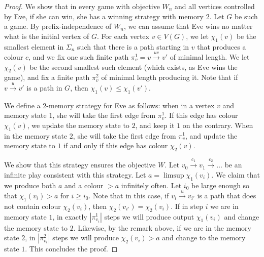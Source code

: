 \documentclass[a4paper,UKenglish,cleveref, thm-restate]{lipics-v2021}
\newcommand{\re}[1]{\xrightarrow{#1}}
\renewcommand{\SS}{\Sigma}
\begin{document}
\begin{proof}
    We show that in every game with objective $W_n$ and all vertices controlled by Eve, if she can win, she has a winning strategy with memory $2$.
    Let $G$ be such a game.
    By prefix-independence of $W_n$, we can assume that Eve wins no matter what is the initial vertex of $G$.
    For each vertex $v\in V(G)$, we let $\chi_1(v)$ be the smallest element in $\SS_n$ such that there is a path starting in $v$ that produces a colour $c$, and we fix one such finite path $\pi_v^1 = v \re{ uc} v'$ of minimal length.
    We let $\chi_2(v)$ be the second smallest such element (which exists, as Eve wins the game), and fix a finite path $\pi_v^2$ of minimal length producing it.
    Note that if $v\re{u} v'$ is a path in $G$, then $\chi_1(v) \leq \chi_1(v')$.


    We define a $2$-memory strategy for Eve as follows: when in a vertex $v$ and memory state $1$, she will take the first edge from $\pi_v^1$.
    If this edge has colour $\chi_1(v)$, we update the memory state to $2$, and keep it $1$ on the contrary.
    When in the memory state $2$, she will take the first edge from $\pi_v^1$, and update the memory state to $1$ if and only if this edge has colour $\chi_2(v)$.

    We show that this strategy ensures the objective $W$. Let $v_0\re{c_1} v_1\re{c_2}\dots$ be an infinite play consistent with this strategy.
    Let $a = \limsup \chi_1(v_i)$.
    We claim that we produce both $a$ and a colour $>a$ infinitely often.
    Let $i_0$ be large enough so that $\chi_1(v_i) > a$ for $i\geq i_0$. Note that in this case, if $v_i\re{u} v_{i'}$ is a path that does not contain colour $\chi_2(v_i)$, then  $\chi_2(v_{i'}) =  \chi_2(v_i)$.
    If in step $i$ we are in memory state $1$, 
    in exactly $|\pi_{v_{i}}^1|$ steps we will produce output $\chi_1(v_{i})$ and change the memory state to $2$.
    Likewise, by the remark above, if we are in the memory state $2$, in $|\pi_{v_{i}}^2|$ steps we will produce $\chi_2(v_i) > a$ and change to the memory state $1$.
    This concludes the proof.
\end{proof} 
\end{document}
